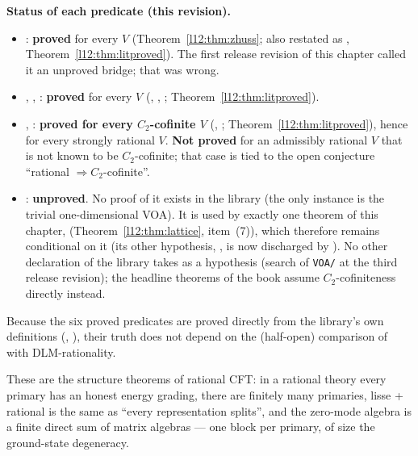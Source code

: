 \begin{dictionary}
\textbf{Status of each predicate (this revision).}
\begin{itemize}
\item {}: \textbf{proved} for every $V$ (Theorem~\ref{l12:thm:zhuss}; also restated as
  , Theorem~\ref{l12:thm:litproved}). The first release revision of this chapter called it
  an unproved bridge; that was wrong.
\item {}, , : \textbf{proved} for
  every $V$ (, , ;
  Theorem~\ref{l12:thm:litproved}).
\item {}, : \textbf{proved for every $C_2$-cofinite $V$}
  (, ;
  Theorem~\ref{l12:thm:litproved}), hence for every strongly rational $V$. \textbf{Not proved} for an admissibly rational $V$
  that is not known to be $C_2$-cofinite; that case is tied to the open conjecture ``rational $\Rightarrow C_2$-cofinite''.
\item {}: \textbf{unproved}. No proof of it exists in the library (the only instance is the
  trivial one-dimensional VOA). It is used by exactly one theorem of this chapter,
   (Theorem~\ref{l12:thm:lattice}, item~(7)), which therefore remains
  conditional on it (its other hypothesis, , is now discharged by ). No
  other declaration of the library takes  as a hypothesis (search of \texttt{VOA/} at
  the third release revision); the headline theorems of the book assume $C_2$-cofiniteness directly instead.
\end{itemize}
Because the six proved predicates are proved directly from the library's own definitions (,
), their truth does not depend on the (half-open) comparison of  with
DLM-rationality.
\end{dictionary}

\begin{physics}
These are the structure theorems of rational CFT: in a rational theory every primary has an honest energy grading, there
are finitely many primaries, lisse + rational is the same as ``every representation splits'', and the zero-mode algebra is a
finite direct sum of matrix algebras --- one block per primary, of size the ground-state degeneracy.
\end{physics}

